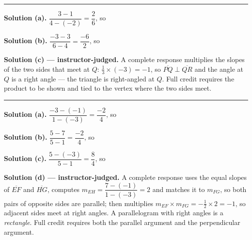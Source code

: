 \documentclass[12pt]{article}
\begin{document}
\vspace{0.15cm}\noindent\rule{\linewidth}{0.2pt}


\noindent\textbf{Solution (a).} $\dfrac{3-1}{4-(-2)} = \dfrac{2}{6}$, so

\noindent\textbf{Solution (b).} $\dfrac{-3-3}{6-4} = \dfrac{-6}{2}$, so

\noindent\textbf{Solution (c) --- instructor-judged.} A complete response
multiplies the slopes of the two sides that meet at $Q$:
$\tfrac{1}{3} \times (-3) = -1$, so $\overline{PQ} \perp \overline{QR}$ and the
angle at $Q$ is a right angle --- the triangle is right-angled at $Q$. Full
credit requires the product to be shown and tied to the vertex where the two
sides meet.

\vspace{0.15cm}\noindent\rule{\linewidth}{0.2pt}


\noindent\textbf{Solution (a).} $\dfrac{-3-(-1)}{1-(-3)} = \dfrac{-2}{4}$, so

\noindent\textbf{Solution (b).} $\dfrac{5-7}{5-1} = \dfrac{-2}{4}$, so

\noindent\textbf{Solution (c).} $\dfrac{5-(-3)}{5-1} = \dfrac{8}{4}$, so

\noindent\textbf{Solution (d) --- instructor-judged.} A complete response uses
the equal slopes of $\overline{EF}$ and $\overline{HG}$, computes
$m_{EH} = \dfrac{7-(-1)}{1-(-3)} = 2$ and matches it to $m_{FG}$, so both pairs
of opposite sides are parallel; then multiplies
$m_{EF} \times m_{FG} = -\tfrac{1}{2} \times 2 = -1$, so adjacent sides meet at
right angles. A parallelogram with right angles is a \emph{rectangle}. Full
credit requires both the parallel argument and the perpendicular argument.
\end{document}
